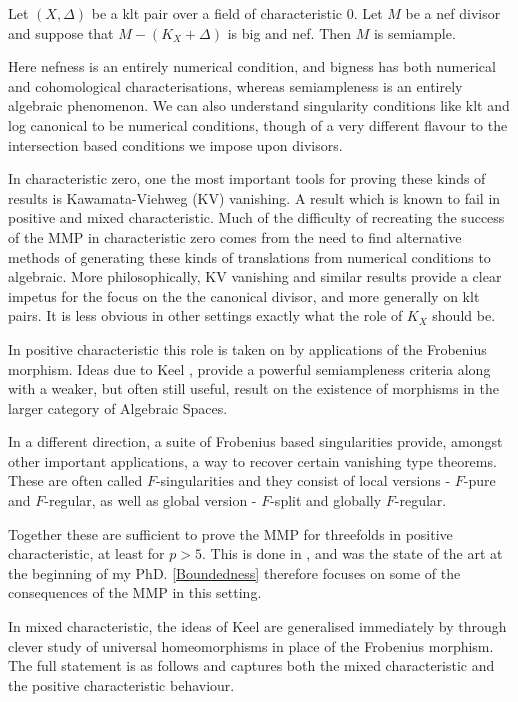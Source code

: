 \documentclass[a4paper,12pt]{book}
\begin{document}
	\begin{theorem*}\cite[Theorem 3.3]{KM}
		Let $(X,\Delta)$ be a klt pair over a field of characteristic $0$. Let $M$ be a nef divisor and suppose that $M-(K_{X}+\Delta)$ is big and nef. Then $M$ is semiample.
	\end{theorem*}
	
	Here nefness is an entirely numerical condition, and bigness has both numerical and cohomological characterisations, whereas semiampleness is an entirely algebraic phenomenon. We can also understand singularity conditions like klt and log canonical to be numerical conditions, though of a very different flavour to the intersection based conditions we impose upon divisors.
	
	In characteristic zero, one the most important tools for proving these kinds of results is Kawamata-Viehweg (KV) vanishing. A result which is known to fail in positive and mixed characteristic. Much of the difficulty of recreating the success of the MMP in characteristic zero comes from the need to find alternative methods of generating these kinds of translations from numerical conditions to algebraic. More philosophically, KV vanishing and similar results provide a clear impetus for the focus on the the canonical divisor, and more generally on klt pairs. It is less obvious in other settings exactly what the role of $K_{X}$ should be.
	
	In positive characteristic this role is taken on by applications of the Frobenius morphism. Ideas due to Keel \cite{}, provide a powerful semiampleness criteria along with a weaker, but often still useful, result on the existence of morphisms in the larger category of Algebraic Spaces. 
	
	In a different direction, a suite of Frobenius based singularities provide, amongst other important applications, a way to recover certain vanishing type theorems. These are often called $F$-singularities and they consist of local versions - $F$-pure and $F$-regular, as well as global version - $F$-split and globally $F$-regular.
	
	Together these are sufficient to prove the MMP for threefolds in positive characteristic, at least for $p > 5$. This is done in \cite{}, and was the state of the art at the beginning of my PhD. \autoref{Boundedness} therefore focuses on some of the consequences of the MMP in this setting.
	
	In mixed characteristic, the ideas of Keel are generalised immediately by \cite{} through clever study of universal homeomorphisms in place of the Frobenius morphism. The full statement is as follows and captures both the mixed characteristic and the positive characteristic behaviour.
	
\end{document}
